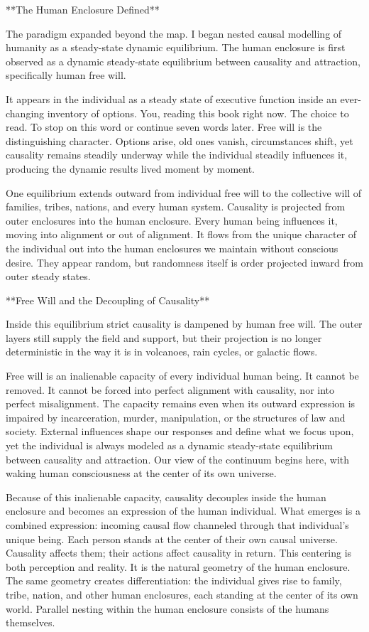 **The Human Enclosure Defined**

The paradigm expanded beyond the map. I began nested causal modelling of humanity as a steady-state dynamic equilibrium. The human enclosure is first observed as a dynamic steady-state equilibrium between causality and attraction, specifically human free will.

It appears in the individual as a steady state of executive function inside an ever-changing inventory of options. You, reading this book right now. The choice to read. To stop on this word or continue seven words later. Free will is the distinguishing character. Options arise, old ones vanish, circumstances shift, yet causality remains steadily underway while the individual steadily influences it, producing the dynamic results lived moment by moment.

One equilibrium extends outward from individual free will to the collective will of families, tribes, nations, and every human system. Causality is projected from outer enclosures into the human enclosure. Every human being influences it, moving into alignment or out of alignment. It flows from the unique character of the individual out into the human enclosures we maintain without conscious desire. They appear random, but randomness itself is order projected inward from outer steady states.

**Free Will and the Decoupling of Causality**

Inside this equilibrium strict causality is dampened by human free will. The outer layers still supply the field and support, but their projection is no longer deterministic in the way it is in volcanoes, rain cycles, or galactic flows.

Free will is an inalienable capacity of every individual human being. It cannot be removed. It cannot be forced into perfect alignment with causality, nor into perfect misalignment. The capacity remains even when its outward expression is impaired by incarceration, murder, manipulation, or the structures of law and society. External influences shape our responses and define what we focus upon, yet the individual is always modeled as a dynamic steady-state equilibrium between causality and attraction. Our view of the continuum begins here, with waking human consciousness at the center of its own universe.

Because of this inalienable capacity, causality decouples inside the human enclosure and becomes an expression of the human individual. What emerges is a combined expression: incoming causal flow channeled through that individual’s unique being. Each person stands at the center of their own causal universe. Causality affects them; their actions affect causality in return. This centering is both perception and reality. It is the natural geometry of the human enclosure. The same geometry creates differentiation: the individual gives rise to family, tribe, nation, and other human enclosures, each standing at the center of its own world. Parallel nesting within the human enclosure consists of the humans themselves.

